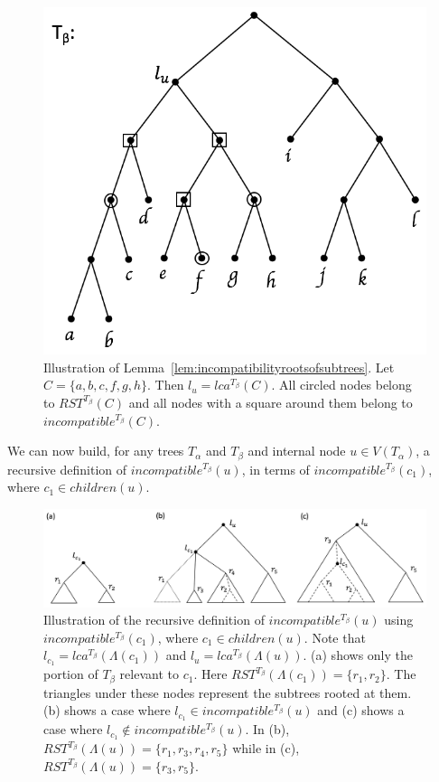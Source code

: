 \documentclass{article}
\newcommand{\leafset}{\Lambda}
\newcommand{\TA}{T_\alpha}
\newcommand{\TB}{T_\beta}
\begin{document}
    \begin{figure}[h]
        \includegraphics[scale=0.5]{rootsofsubtrees}
        \centering
        \caption{Illustration of Lemma~\ref{lem:incompatibilityrootsofsubtrees}. Let $C = \{a, b, c, f, g, h\}$. Then $l_u = lca^{\TB}(C)$. All circled nodes belong to $RST^{\TB}(C)$ and all nodes with a square around them belong to $incompatible^{\TB}(C)$.}
        \label{fig:rootsofsubtrees}
    \end{figure}

    We can now build, for any trees $\TA$ and $\TB$ and internal node $u \in V(\TA)$, a recursive definition of $incompatible^{\TB}(u)$, in terms of $incompatible^{\TB}(c_1)$, where $c_1 \in children(u)$.

    \begin{figure}[h]
        \includegraphics[scale=0.5]{incompatibilityrecursive}
        \centering
        \caption{Illustration of the recursive definition of $incompatible^{\TB}(u)$ using $incompatible^{\TB}(c_1)$, where $c_1 \in children(u)$. Note that $l_{c_1} = lca^{\TB}(\leafset(c_1))$ and $l_u = lca^{\TB}(\leafset(u))$. (a) shows only the portion of $\TB$ relevant to $c_1$. Here $RST^{\TB}(\leafset(c_1)) = \{r_1, r_2\}$. The triangles under these nodes represent the subtrees rooted at them. (b) shows a case where $l_{c_1} \in incompatible^{\TB}(u)$ and (c) shows a case where $l_{c_1} \not\in incompatible^{\TB}(u)$. In (b), $RST^{\TB}(\leafset(u)) = \{r_1, r_3, r_4, r_5\}$ while in (c), $RST^{\TB}(\leafset(u)) = \{r_3, r_5\}$.}
        \label{fig:incompatibilityrecursive}
    \end{figure}
\end{document}
